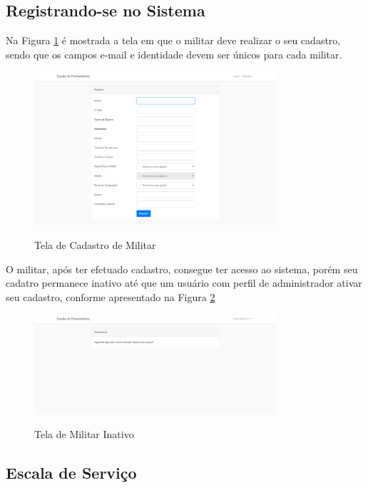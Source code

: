 \subsection{Registrando-se no Sistema}

Na Figura \ref{fig:singnup} é mostrada a tela em que o militar deve realizar o seu cadastro, sendo que os campos e-mail e identidade devem ser únicos para cada militar.

\begin{figure}[!htb]
    \centering
    \caption{Tela de Cadastro de Militar}
    \includegraphics[width=0.8\textwidth]{images/2 - Tela de Cadastro.png}
    \label{fig:singnup}
\end{figure}

O militar, após ter efetuado cadastro, consegue ter acesso ao sistema, porém seu cadatro permanece inativo até que um usuário com perfil de administrador ativar seu cadastro, conforme apresentado na Figura \ref{fig:userinative}

\begin{figure}[!htb]
    \centering
    \caption{Tela de Militar Inativo}
    \includegraphics[width=0.8\textwidth]{images/3 - Tela de Militar Inativo.png}
    \label{fig:userinative}
\end{figure}

\subsection{Escala de Serviço}

